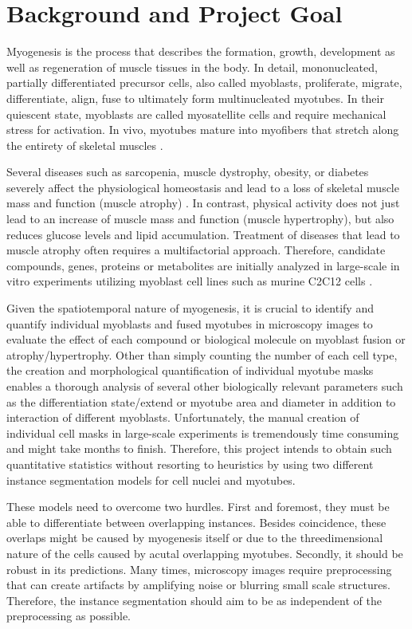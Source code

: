 \section{Background and Project Goal}
Myogenesis is the process that describes the formation, growth, development as well as regeneration of muscle tissues in the body. In detail, mononucleated, partially differentiated precursor cells, also called myoblasts, proliferate, migrate, differentiate, align, fuse to ultimately form multinucleated myotubes. In their quiescent state, myoblasts are called myosatellite cells and require mechanical stress for activation. In vivo, myotubes mature into myofibers that stretch along the entirety of skeletal muscles \cite{tajbakhsh2009, bentzinger, bollen}.

Several diseases such as sarcopenia, muscle dystrophy, obesity, or diabetes severely affect the physiological homeostasis and lead to a loss of skeletal muscle mass and function (muscle atrophy) \cite{argiles}. In contrast, physical activity does not just lead to an increase of muscle mass and function (muscle hypertrophy), but also reduces glucose levels and lipid accumulation. Treatment of diseases that lead to muscle atrophy often requires a multifactorial approach. Therefore, candidate compounds, genes, proteins or metabolites are initially analyzed in large-scale in vitro experiments utilizing myoblast cell lines such as murine C2C12 cells \cite{bajaj}.

Given the spatiotemporal nature of myogenesis, it is crucial to identify and quantify individual myoblasts and fused myotubes in microscopy images to evaluate the effect of each compound or biological molecule on myoblast fusion or atrophy/hypertrophy. Other than simply counting the number of each cell type, the creation and morphological quantification of individual myotube masks enables a thorough analysis of several other biologically relevant parameters such as the differentiation state/extend or myotube area and diameter in addition to interaction of different myoblasts. Unfortunately, the manual creation of individual cell masks in large-scale experiments is tremendously time consuming and might take months to finish. Therefore, this project intends to obtain such quantitative statistics without resorting to heuristics by using two different instance segmentation models for cell nuclei and myotubes.

These models need to overcome two hurdles. First and foremost, they must be able to differentiate between overlapping instances. Besides coincidence, these overlaps might be caused by myogenesis itself or due to the threedimensional nature of the cells caused by acutal overlapping myotubes. Secondly, it should be robust in its predictions. Many times, microscopy images require preprocessing that can create artifacts by amplifying noise or blurring small scale structures. Therefore, the instance segmentation should aim to be as independent of the preprocessing as possible.

